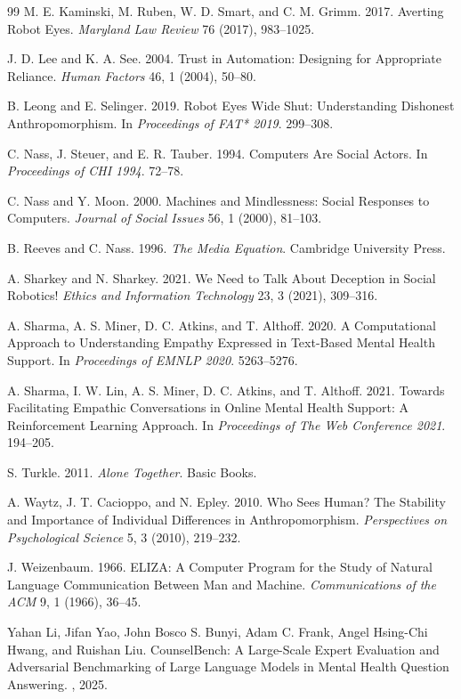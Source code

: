 \documentclass[manuscript,review,anonymous]{acmart}
\begin{document}
\begin{thebibliography}{99}
M. E. Kaminski, M. Ruben, W. D. Smart, and C. M. Grimm.
2017.
Averting Robot Eyes.
\textit{Maryland Law Review} 76 (2017), 983--1025.

J. D. Lee and K. A. See.
2004.
Trust in Automation: Designing for Appropriate Reliance.
\textit{Human Factors} 46, 1 (2004), 50--80.

B. Leong and E. Selinger.
2019.
Robot Eyes Wide Shut: Understanding Dishonest Anthropomorphism.
In \textit{Proceedings of FAT* 2019}. 299--308.

C. Nass, J. Steuer, and E. R. Tauber.
1994.
Computers Are Social Actors.
In \textit{Proceedings of CHI 1994}. 72--78.

C. Nass and Y. Moon.
2000.
Machines and Mindlessness: Social Responses to Computers.
\textit{Journal of Social Issues} 56, 1 (2000), 81--103.

B. Reeves and C. Nass.
1996.
\textit{The Media Equation}.
Cambridge University Press.

A. Sharkey and N. Sharkey.
2021.
We Need to Talk About Deception in Social Robotics!
\textit{Ethics and Information Technology} 23, 3 (2021), 309--316.

A. Sharma, A. S. Miner, D. C. Atkins, and T. Althoff.
2020.
A Computational Approach to Understanding Empathy Expressed in Text-Based Mental Health Support.
In \textit{Proceedings of EMNLP 2020}. 5263--5276.

A. Sharma, I. W. Lin, A. S. Miner, D. C. Atkins, and T. Althoff.
2021.
Towards Facilitating Empathic Conversations in Online Mental Health Support: A Reinforcement Learning Approach.
In \textit{Proceedings of The Web Conference 2021}. 194--205.

S. Turkle.
2011.
\textit{Alone Together}.
Basic Books.

A. Waytz, J. T. Cacioppo, and N. Epley.
2010.
Who Sees Human? The Stability and Importance of Individual Differences in Anthropomorphism.
\textit{Perspectives on Psychological Science} 5, 3 (2010), 219--232.

J. Weizenbaum.
1966.
ELIZA: A Computer Program for the Study of Natural Language Communication Between Man and Machine.
\textit{Communications of the ACM} 9, 1 (1966), 36--45.

Yahan Li, Jifan Yao, John Bosco S. Bunyi, Adam C. Frank, Angel Hsing-Chi Hwang, and Ruishan Liu.
\newblock Counsel{B}ench: A {L}arge-{S}cale {E}xpert {E}valuation and {A}dversarial {B}enchmarking of {L}arge {L}anguage {M}odels in {M}ental {H}ealth {Q}uestion {A}nswering.
, 2025.



\end{thebibliography}
\end{document}

